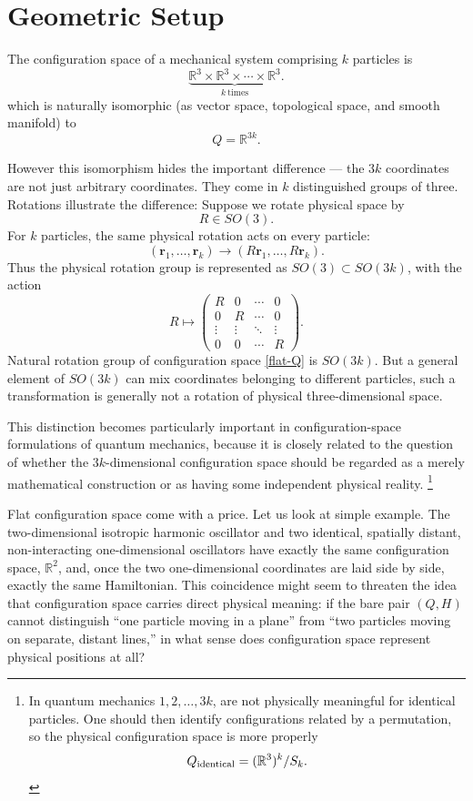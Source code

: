 \section{Geometric Setup}
\label{sec:cm-geom}

The configuration space of a mechanical system comprising $k$ particles is 
\[   
 \underbrace{\mathbb R^3\times\mathbb R^3\times\cdots\times\mathbb R^3}_{k\ \text{times}}. 
\]
which is naturally isomorphic (as vector space, topological space, and smooth manifold) to
\begin{equation}
   \label {flat-Q}
   Q=\mathbb R^{3k}.
\end{equation}

However this isomorphism hides the important difference ---
the \(3k\) coordinates are not just arbitrary coordinates. They come in \(k\)
distinguished groups of three. Rotations illustrate the difference:
Suppose we rotate physical space by
\[ R\in SO(3). \]
For \(k\) particles, the same physical rotation acts on every particle:
\[
    (\mathbf r_1,\ldots,\mathbf r_k) \longrightarrow (R\mathbf r_1,\ldots,R\mathbf r_k). 
\]
Thus the physical rotation group is represented as
$ SO(3)\subset SO(3k)$, with the action
\[ R\mapsto 
\begin{pmatrix} R&0&\cdots&0\\ 
0&R&\cdots&0\\ 
\vdots&\vdots&\ddots&\vdots\\
0&0&\cdots&R 
\end{pmatrix}. 
\]
Natural rotation group of configuration space \eqref{flat-Q} is \(SO(3k)\).
But a general element of \(SO(3k)\) can mix coordinates belonging to different particles,
such a transformation is generally not a rotation of physical three-dimensional space.

This distinction becomes particularly important in configuration-space
formulations of  quantum mechanics, because it is closely related
to the question of whether the \(3k\)-dimensional configuration space should be
regarded as a merely mathematical construction or as having some independent
physical reality.
\footnote{In quantum mechanics  $ 1,2,\ldots,3k $,
are not physically meaningful for identical particles. One should then identify
configurations related by a permutation,
so the physical configuration space is more properly
\[ Q_{\rm identical} = (\mathbb R^3)^k/S_k. \]}

Flat configuration space  come with a price. Let us look at simple example.
The two-dimensional isotropic harmonic oscillator and two identical, spatially
distant, non-interacting one-dimensional oscillators have exactly the same
configuration space, $\mathbb{R}^2$, and, once the two one-dimensional
coordinates are laid side by side, exactly the same Hamiltonian. This
coincidence might seem to threaten the idea that configuration space carries
direct physical meaning: if the bare pair $(Q,H)$ cannot distinguish ``one
particle moving in a plane'' from ``two particles moving on separate, distant
lines,'' in what sense does configuration space represent physical positions at
all? 

